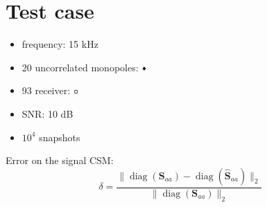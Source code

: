\documentclass[9pt,xcolor=x11names,compress, notes=show]{beamer}%
\newcommand{\diag}[1]{\operatorname{diag}\left(#1\right)}
\begin{document}
\section{Test case}
\begin{frame}{\insertsectionhead}
	\begin{center}
		\noindent\begin{minipage}{\linewidth}
		     	\begin{minipage}{0.4\linewidth}
	         			\begin{itemize}
					\item frequency: 15 kHz
					\item 20  uncorrelated monopoles: \textcolor{red}{$\vcenter{\hbox{\tiny$\blacklozenge$}}$}
					\item 93 receiver: \textcolor{colorAlice}{$\vcenter{\hbox{\small$\bm{\circ}$}}$}
					\item SNR: 10 dB
					\item $10^4$ snapshots
				\end{itemize}	
	               		\vfill
	     		\end{minipage}
	      		\hfill
	     		 \begin{minipage}{0.55\linewidth}
             			\centering
				
	      		\end{minipage}
		\end{minipage}
	\end{center}
	Error on the signal CSM:
	\begin{equation*}
   		 \delta = \frac{\|\diag{\bm{S}_{aa}}  - \diag{\bm{\hat{S}}_{aa}}\|_2}{\|\diag{\bm{S}_{aa} } \|_2}
	\end{equation*}
\end{frame}

\end{document}
